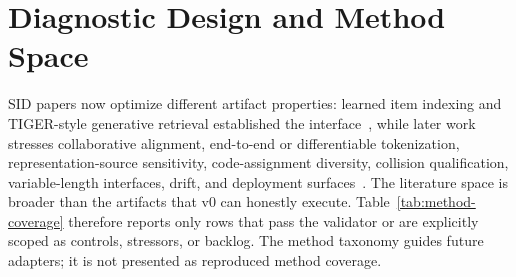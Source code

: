 \section{Diagnostic Design and Method Space}

SID papers now optimize different artifact properties: learned item indexing
and TIGER-style generative retrieval established the interface~\cite{hua2023indexids,rajput2023tiger},
while later work stresses collaborative alignment, end-to-end or
differentiable tokenization, representation-source sensitivity,
code-assignment diversity, collision qualification, variable-length
interfaces, drift, and deployment surfaces~\cite{zheng2023lcrec,zhu2024cost,wang2024letter,liu2024elit,fu2026diger,qiao2026textasvision,hu2026quasid,pan2026adasid,cheng2026capsid,baikalov2026staleness,ju2026snapchatsid}.
The literature space is broader than the artifacts that v0 can honestly
execute. Table~\ref{tab:method-coverage} therefore reports only rows that pass
the validator or are explicitly scoped as controls, stressors, or backlog. The
method taxonomy guides future adapters; it is not presented as reproduced
method coverage.


